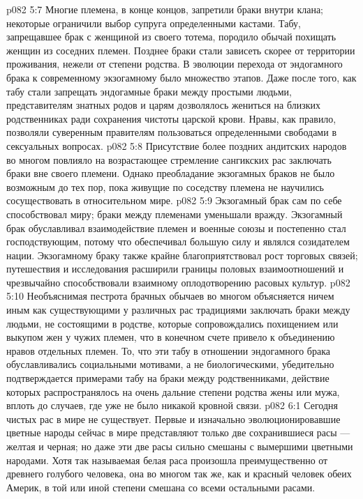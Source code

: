 \vs p082 5:7 Многие племена, в конце концов, запретили браки внутри клана; некоторые ограничили выбор супруга определенными кастами. Табу, запрещавшее брак с женщиной из своего тотема, породило обычай похищать женщин из соседних племен. Позднее браки стали зависеть скорее от территории проживания, нежели от степени родства. В эволюции перехода от эндогамного брака к современному экзогамному было множество этапов. Даже после того, как табу стали запрещать эндогамные браки между простыми людьми, представителям знатных родов и царям дозволялось жениться на близких родственниках ради сохранения чистоты царской крови. Нравы, как правило, позволяли суверенным правителям пользоваться определенными свободами в сексуальных вопросах.
\vs p082 5:8 Присутствие более поздних андитских народов во многом повлияло на возрастающее стремление сангикских рас заключать браки вне своего племени. Однако преобладание экзогамных браков не было возможным до тех пор, пока живущие по соседству племена не научились сосуществовать в относительном мире.
\vs p082 5:9 Экзогамный брак сам по себе способствовал миру; браки между племенами уменьшали вражду. Экзогамный брак обуславливал взаимодействие племен и военные союзы и постепенно стал господствующим, потому что обеспечивал большую силу и являлся созидателем нации. Экзогамному браку также крайне благоприятствовал рост торговых связей; путешествия и исследования расширили границы половых взаимоотношений и чрезвычайно способствовали взаимному оплодотворению расовых культур.
\vs p082 5:10 Необъяснимая пестрота брачных обычаев во многом объясняется ничем иным как существующими у различных рас традициями заключать браки между людьми, не состоящими в родстве, которые сопровождались похищением или выкупом жен у чужих племен, что в конечном счете привело к объединению нравов отдельных племен. То, что эти табу в отношении эндогамного брака обуславливались социальными мотивами, а не биологическими, убедительно подтверждается примерами табу на браки между родственниками, действие которых распространялось на очень дальние степени родства жены или мужа, вплоть до случаев, где уже не было никакой кровной связи.
\vs p082 6:1 Сегодня чистых рас в мире не существует. Первые и изначально эволюционировавшие цветные народы сейчас в мире представляют только две сохранившиеся расы --- желтая и черная; но даже эти две расы сильно смешаны с вымершими цветными народами. Хотя так называемая белая раса произошла преимущественно от древнего голубого человека, она во многом так же, как и красный человек обеих Америк, в той или иной степени смешана со всеми остальными расами.
